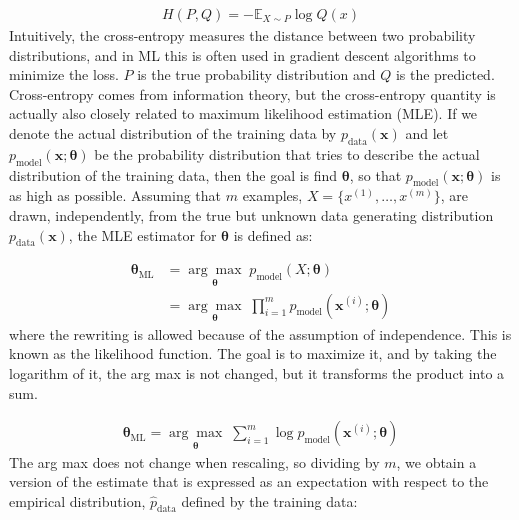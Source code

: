 \begin{align}
    \label{cross-entropy} H(P,Q) = -\mathbb{E}_{X \sim P} \log Q(x)
\end{align}
Intuitively, the cross-entropy measures the distance between two probability distributions, and in ML this is often used in gradient descent algorithms to minimize the loss. $P$ is the true probability distribution and $Q$ is the predicted. \\ 

\noindent Cross-entropy comes from information theory, but the cross-entropy quantity is actually also closely related to maximum likelihood estimation (MLE). If we denote the actual distribution of the training data by $p_{\text{data}}(\mathbf{x})$ and let $p_{\text{model}}(\mathbf{x}; \boldsymbol{\theta})$ be the probability distribution that tries to describe the actual distribution of the training data, then the goal is find $\boldsymbol{\theta}$, so that $p_{\text{model}}(\mathbf{x}; \boldsymbol{\theta})$ is as high as possible. Assuming that $m$ examples, $X = \{ x^{(1)}, \ldots, x^{(m)} \}$, are drawn, independently, from the true but unknown data generating distribution $p_{\text{data}}(\mathbf{x})$, the MLE estimator for $\boldsymbol{\theta}$ is defined as: 

\begin{align*}
    \boldsymbol{\theta}_{\text{ML}} &=  \underset{\boldsymbol{\theta}}{\arg \max} \;  p_{\text{model}} (X; \boldsymbol{\theta}) \\
    & = \underset{\boldsymbol{\theta}}{\arg \max} \; \prod_{i=1} ^m p_{\text{model}} (\mathbf{x}^{(i)}; \boldsymbol{\theta})
\end{align*}
where the rewriting is allowed because of the assumption of independence. This is known as the likelihood function. The goal is to maximize it, and by taking the logarithm of it, the arg max is not changed, but it transforms the product into a sum. 

\begin{align*}
    \boldsymbol{\theta}_{\text{ML}} = \underset{\boldsymbol{\theta}}{\arg \max} \; \sum_{i=1} ^m \log p_{\text{model}} (\mathbf{x}^{(i)}; \boldsymbol{\theta})
\end{align*}
The arg max does not change when rescaling, so dividing by $m$, we obtain a version of the estimate that is expressed as an expectation with respect to the empirical distribution, $\hat{p}_{\text{data}}$ defined by the training data:

